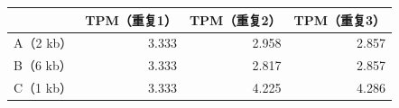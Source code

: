 \begin{table}[htbp]
\centering
{}
\label{tab:ch04a-05}
\begin{tabular}{lrrr}
\toprule
&TPM（重复1）&TPM（重复2）&TPM（重复3）\\
\midrule
A（2 kb） & 3.333 & 2.958 & 2.857\\
B（6 kb） & 3.333 & 2.817 & 2.857\\
C（1 kb） & 3.333 & 4.225 & 4.286\\
\bottomrule
\end{tabular}
\end{table}
